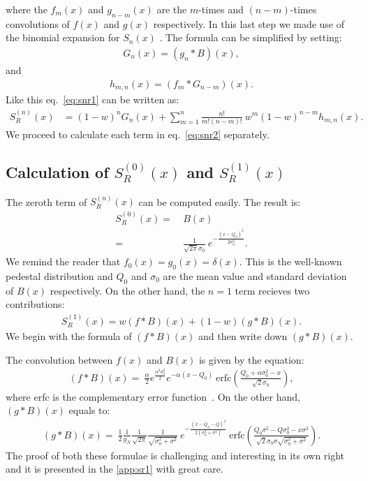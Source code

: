 \documentclass[preprint,12pt]{elsarticle}
\begin{document}
where the $f_m(x)$ and $g_{n-m}(x)$ are the $m$-times and $(n-m)$-times convolutions of $f(x)$ and $g(x)$ respectively. 
In this last step we made use of the binomial expansion for $S_n(x)$ \cite{error}. 
The formula can be simplified by setting:
\begin{align}
G_n(x) = (g_{n} *B )(x), 
\end{align}
and 
\begin{align}
h_{m,n}(x) = (f_{m} * G_{n-m} )(x).  
\end{align}
Like this eq.~\eqref{eq:snr1} can be written as:
\begin{align}
S^{(n)}_R(x) & = (1-w)^n G_n(x) + \sum_{m=1}^{n}  \frac{n!}{m!(n-m)!} \ w^m (1-w)^{n-m} h_{m,n}(x). \label{eq:snr2}
\end{align}
We proceed to calculate each term in eq.~\eqref{eq:snr2} separately.  


\subsection{Calculation of $S^{(0)}_R(x)$ and $S^{(1)}_R(x)$}
%

The zeroth term of $S^{(n)}_R(x)$ can be computed easily. 
The result is:
\begin{align}
S^{(0)}_R(x)  = \ & B(x) \nonumber \\
                      = \ & \frac{1}{\sqrt{2\pi}\sigma_0} \ e^{-\frac{(x-Q_0)^2}{2\sigma_0^2}}.
\end{align}
We remind the reader that $f_0(x)=g_0(x)=\delta (x)$. 
This is the well-known pedestal distribution and $Q_0$ and $\sigma_0$ are the mean value and standard deviation of $B(x)$ respectively. 
On the other hand, the $n=1$ term recieves two contributions:
\begin{align}
S^{(1)}_R(x)  = w (f*B)(x) + (1-w)(g*B)(x). 
\end{align}                     
We begin with the formula of $(f*B)(x)$ and then write down $(g*B)(x)$.

The convolution between $f(x)$ and $B(x)$ is given by the equation:
\begin{align}
(f*B)(x)  = \ \frac{\alpha}{2} e^{\frac{\alpha^2\sigma_0^2}{2}} e^{-\alpha (x-Q_0)} \ \text{erfc}\left( \frac{Q_0 + \alpha\sigma_0^2 - x }{\sqrt{2}\sigma_0} \right),
\end{align}  
where erfc is the complementary error function~\cite{error}.
On the other hand, $(g*B)(x)$ equals to:
\begin{align}
(g*B)(x)  = \ \frac{1}{2}  \frac{1}{g_N}  \frac{1}{\sqrt{2\pi}} \frac{1}{\sqrt{\sigma_0^2 + \sigma^2}}   \ e^{ -\frac{ (x-Q_0-Q)^2 }{2(\sigma_0^2 + \sigma^2)}} 
\ \text{erfc}\left(  \frac{ Q_0\sigma^2 -Q\sigma_0^2 -x \sigma^2  }{\sqrt{2} \sigma_0\sigma\sqrt{\sigma_0^2 + \sigma^2} }   \right).
\end{align}  
The proof of both these formulae is challenging and interesting in its own right and it is presented in the \ref{app:sr1} with great care. 
\end{document}
